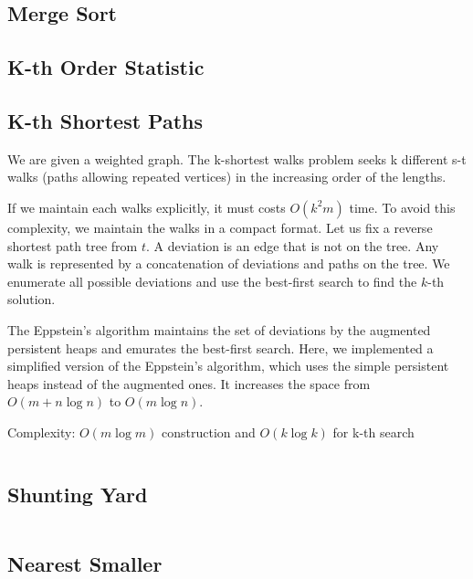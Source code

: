 \subsection{Merge Sort}
\subsection{K-th Order Statistic}
\subsection{K-th Shortest Paths}

We are given a weighted graph. The k-shortest walks problem
seeks k different s-t walks (paths allowing repeated vertices)
in the increasing order of the lengths.

If we maintain each walks explicitly, it must costs $O(k^2 m)$ time.
To avoid this complexity, we maintain the walks in a compact format.
Let us fix a reverse shortest path tree from $t$. A deviation is an 
edge that is not on the tree. Any walk is represented by a concatenation
of deviations and paths on the tree. We enumerate all possible 
deviations and use the best-first search to find the $k$-th solution.

The Eppstein's algorithm maintains the set of deviations by 
the augmented persistent heaps and emurates the best-first search. 
Here, we implemented a simplified version of the Eppstein's algorithm,
which uses the simple persistent heaps instead of the augmented ones.
It increases the space from $O(m + n \log n)$ to $O(m \log n)$. \cite{Eppstein}

Complexity: $O(m \log m)$ construction and $O(k \log k)$ for k-th search

\hrulefill \vspace{-\baselineskip}
\begin{multicols}{2}
\inputminted[autogobble,fontsize=\tiny]{C++}{Algorithms/kth_shortest_path.cpp}
\end{multicols}
\vspace{-\baselineskip}
\noindent \hrulefill

\subsection{Shunting Yard}

\hrulefill \vspace{-\baselineskip}
\begin{multicols}{2}
\inputminted[autogobble,fontsize=\tiny]{C++}{Algorithms/shunting_yard.cpp}
\end{multicols}
\vspace{-\baselineskip}
\noindent \hrulefill

\subsection{Nearest Smaller}

\hrulefill \vspace{-\baselineskip}
\begin{multicols}{2}
\inputminted[autogobble,fontsize=\tiny]{C++}{Algorithms/nearest_smaller.cpp}
\end{multicols}
\vspace{-\baselineskip}